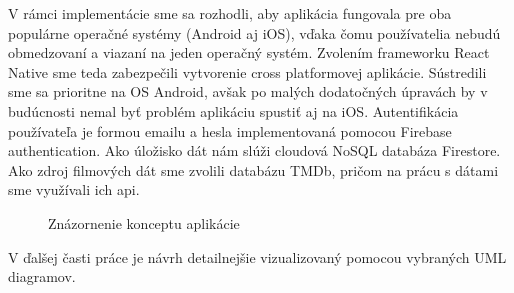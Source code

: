 V rámci implementácie sme sa rozhodli, aby aplikácia fungovala pre oba populárne operačné systémy (Android aj iOS), vďaka čomu používatelia nebudú obmedzovaní a viazaní na jeden operačný systém. Zvolením frameworku React Native sme teda zabezpečili vytvorenie cross platformovej aplikácie. Sústredili sme sa prioritne na OS Android, avšak po malých dodatočných úpravách by v budúcnosti nemal byť problém aplikáciu spustiť aj na iOS. Autentifikácia používateľa je formou emailu a hesla implementovaná pomocou Firebase authentication. Ako úložisko dát nám slúži cloudová NoSQL databáza Firestore. Ako zdroj filmových dát sme zvolili databázu TMDb, pričom na prácu s dátami sme využívali ich \acrshort{api}. 
\vspace{55mm} %

\begin{figure}[hbt!]
  \centering  
  \def\stackalignment{c}
           {\scriptsize}
	\caption{Znázornenie konceptu aplikácie}  
  \label{app-diagram}
\end{figure}

V ďalšej časti práce je návrh detailnejšie vizualizovaný pomocou vybraných UML diagramov. 

\pagebreak

